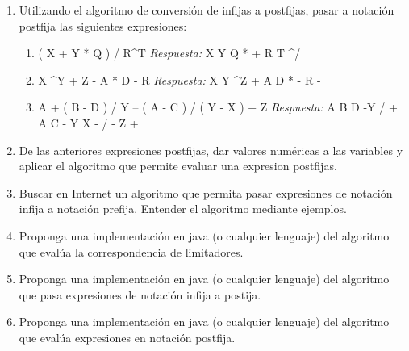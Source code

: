 \begin{enumerate}
	\item Utilizando el algoritmo de conversión de infijas a postfijas, pasar a notación postfija las siguientes expresiones:
	\begin{enumerate}
		\item ( X + Y * Q ) / R\textasciicircum T  \textit{Respuesta:} X Y Q * + R T \textasciicircum/
		\item X \textasciicircum Y + Z - A * D - R \textit{Respuesta:} X Y \textasciicircum Z + A D * - R -
		\item A + ( B - D ) / Y – ( A - C ) / ( Y - X ) + Z \textit{Respuesta:} A B D -Y / + A C - Y X - / - Z +
	\end{enumerate}
	\item De las anteriores expresiones postfijas, dar valores numéricas a las variables y aplicar el algoritmo que permite evaluar una expresion postfijas.
	
	\item Buscar en Internet un algoritmo que permita pasar expresiones de notación infija a notación prefija. Entender el algoritmo mediante ejemplos.
	
	\item Proponga una implementación en java (o cualquier lenguaje) del algoritmo que evalúa la correspondencia de limitadores.
	
	\item Proponga una implementación en java (o cualquier lenguaje) del algoritmo que pasa expresiones de notación infija a postija.
	
	\item Proponga una implementación en java (o cualquier lenguaje) del algoritmo que evalúa expresiones en notación postfija.		
\end{enumerate}

